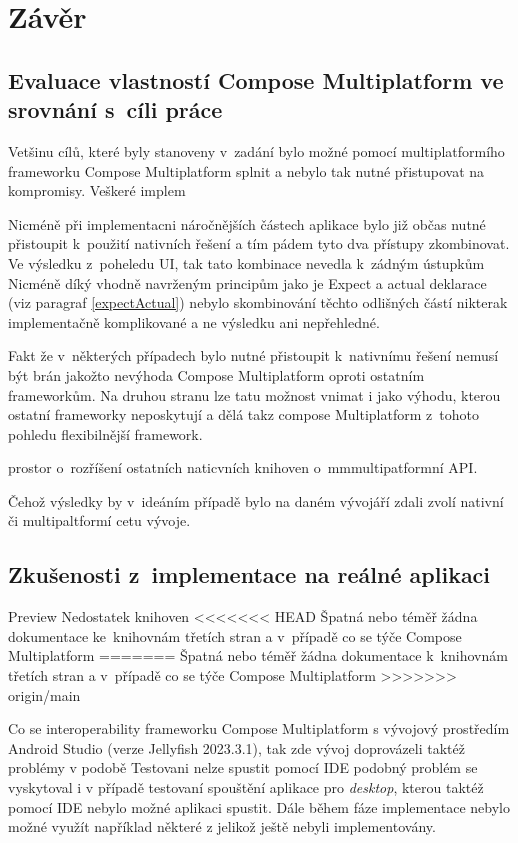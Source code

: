 \chapter{Závěr}

\section{Evaluace vlastností Compose Multiplatform ve srovnání s~cíli práce}
Vetšinu cílů, které byly stanoveny v~zadání bylo možné pomocí multiplatformího frameworku Compose Multiplatform splnit a nebylo tak
nutné přistupovat na kompromisy. Veškeré implem

Nicméně při implementacni náročnějších částech aplikace bylo již občas nutné přistoupit k~použití nativních řešení a tím pádem tyto dva přístupy zkombinovat.
Ve výsledku z~poheledu UI, tak tato kombinace nevedla k~zádným ústupkům
Nicméně díký vhodně navrženým principům jako je Expect a actual deklarace (viz paragraf \ref{expectActual}) nebylo skombinování těchto odlišných částí nikterak
implementačně komplikované a ne výsledku ani nepřehledné. 

Fakt že v~některých případech bylo nutné přistoupit k~nativnímu řešení nemusí být brán jakožto nevýhoda Compose Multiplatform oproti ostatním frameworkům.
Na druhou stranu lze tatu možnost vnimat i jako výhodu, kterou ostatní frameworky neposkytují a dělá takz compose Multiplatform z~tohoto pohledu flexibilnější
framework.

prostor o~rozříšení ostatních naticvních knihoven o~mmmultipatformní API. 

Čehož výsledky by v~ideáním případě bylo na daném vývojáří zdali zvolí nativní či multipaltformí cetu vývoje. 

\section{Zkušenosti z~implementace na reálné aplikaci}
Preview
Nedostatek knihoven
<<<<<<< HEAD
Špatná nebo téměř žádna dokumentace ke~knihovnám třetích stran a v~případě co se týče Compose Multiplatform
=======
Špatná nebo téměř žádna dokumentace k~knihovnám třetích stran a v~případě co se týče Compose Multiplatform
>>>>>>> origin/main

Co se interoperability frameworku Compose Multiplatform s vývojový prostředím Android Studio (verze Jellyfish 2023.3.1), tak zde vývoj doprovázeli 
taktéž problémy v podobě 
Testovani nelze spustit pomocí IDE podobný problém se vyskytoval i v případě testovaní spouštění aplikace pro \textit{desktop}, kterou taktéž pomocí
IDE nebylo možné aplikaci spustit.
Dále během fáze implementace nebylo možné využít například některé z  jelikož ještě nebyli implementovány.


